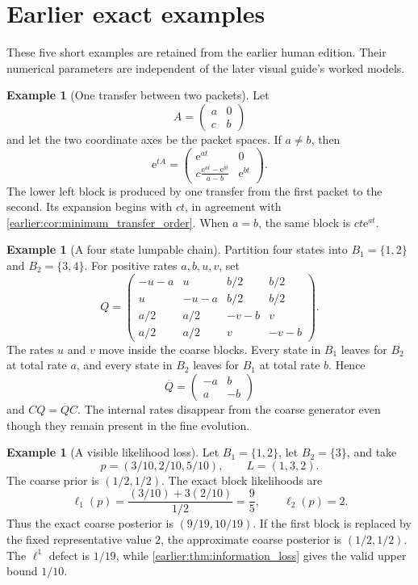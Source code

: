 \documentclass[11pt,a4paper]{article}
\theoremstyle{definition}
\newtheorem{example}[theorem]{Example}
\theoremstyle{remark}
\newcommand{\e}{\mathrm e}
\begin{document}
\section{Earlier exact examples}\label{earlier:section:06}
These five short examples are retained from the earlier human edition. Their numerical parameters are independent of the later visual guide's worked models.
\begin{example}[One transfer between two packets]\label{earlier:record:026}\label{earlier:ex:two_packet_transfer}
Let
\[
A=
\begin{pmatrix}
a&0\\
c&b
\end{pmatrix}
\]
and let the two coordinate axes be the packet spaces. If \(a\neq b\), then
\[
\e^{tA}
=
\begin{pmatrix}
\e^{at}&0\\
\displaystyle c\frac{\e^{at}-\e^{bt}}{a-b}&\e^{bt}
\end{pmatrix}.
\]
The lower left block is produced by one transfer from the first packet to the second. Its expansion begins with \(ct\), in agreement with \cref{earlier:cor:minimum_transfer_order}. When \(a=b\), the same block is \(ct\e^{at}\).
\end{example}

\begin{example}[A four state lumpable chain]\label{earlier:record:027}\label{earlier:ex:four_state_lumping}
Partition four states into \(B_1=\{1,2\}\) and \(B_2=\{3,4\}\). For positive rates \(a,b,u,v\), set
\[
Q=
\begin{pmatrix}
-u-a&u&b/2&b/2\\
u&-u-a&b/2&b/2\\
a/2&a/2&-v-b&v\\
a/2&a/2&v&-v-b
\end{pmatrix}.
\]
The rates \(u\) and \(v\) move inside the coarse blocks. Every state in \(B_1\) leaves for \(B_2\) at total rate \(a\), and every state in \(B_2\) leaves for \(B_1\) at total rate \(b\). Hence
\[
\overline Q=
\begin{pmatrix}
-a&b\\
a&-b
\end{pmatrix}
\]
and \(CQ=\overline QC\). The internal rates disappear from the coarse generator even though they remain present in the fine evolution.
\end{example}

\begin{example}[A visible likelihood loss]\label{earlier:record:028}\label{earlier:ex:bayes_information_loss}
Let \(B_1=\{1,2\}\), let \(B_2=\{3\}\), and take
\[
p=(3/10,2/10,5/10),
\qquad
L=(1,3,2).
\]
The coarse prior is \((1/2,1/2)\). The exact block likelihoods are
\[
\ell_1(p)=\frac{(3/10)+3(2/10)}{1/2}=\frac95,
\qquad
\ell_2(p)=2.
\]
Thus the exact coarse posterior is \((9/19,10/19)\). If the first block is replaced by the fixed representative value \(2\), the approximate coarse posterior is \((1/2,1/2)\). The \(\ell^1\) defect is \(1/19\), while \cref{earlier:thm:information_loss} gives the valid upper bound \(1/10\).
\end{example}
\end{document}
